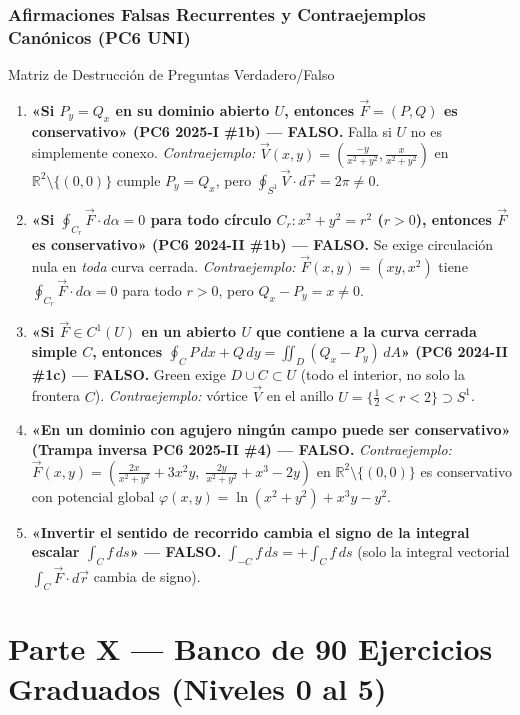 \documentclass[11pt,a4paper]{article}
\begin{document}
\section{Afirmaciones Falsas Recurrentes y Contraejemplos Canónicos (PC6 UNI)}
\begin{errorbox}{Matriz de Destrucción de Preguntas Verdadero/Falso}
\begin{enumerate}[leftmargin=*, itemsep=0.45em]
  \item \textbf{«Si $P_y = Q_x$ en su dominio abierto $U$, entonces $\vec{F}=(P,Q)$ es conservativo» (PC6 2025-I \#1b) --- FALSO.}
  Falla si $U$ no es simplemente conexo. \emph{Contraejemplo:} $\vec{V}(x,y) = \left(\frac{-y}{x^2+y^2}, \frac{x}{x^2+y^2}\right)$ en $\mathbb{R}^2\setminus\{(0,0)\}$ cumple $P_y = Q_x$, pero $\oint_{S^1}\vec{V}\cdot d\vec{r} = 2\pi \neq 0$.
  \item \textbf{«Si $\oint_{C_r} \vec{F}\cdot d\alpha = 0$ para todo círculo $C_r: x^2+y^2=r^2$ ($r>0$), entonces $\vec{F}$ es conservativo» (PC6 2024-II \#1b) --- FALSO.}
  Se exige circulación nula en \emph{toda} curva cerrada. \emph{Contraejemplo:} $\vec{F}(x,y)=(xy, x^2)$ tiene $\oint_{C_r}\vec{F}\cdot d\alpha = 0$ para todo $r>0$, pero $Q_x - P_y = x \neq 0$.
  \item \textbf{«Si $\vec{F} \in C^1(U)$ en un abierto $U$ que contiene a la curva cerrada simple $C$, entonces $\oint_C P\,dx+Q\,dy = \iint_D (Q_x-P_y)\,dA$» (PC6 2024-II \#1c) --- FALSO.}
  Green exige $D \cup C \subset U$ (todo el interior, no solo la frontera $C$). \emph{Contraejemplo:} vórtice $\vec{V}$ en el anillo $U = \{\frac{1}{2} < r < 2\} \supset S^1$.
  \item \textbf{«En un dominio con agujero ningún campo puede ser conservativo» (Trampa inversa PC6 2025-II \#4) --- FALSO.}
  \emph{Contraejemplo:} $\vec{F}(x,y) = \left(\frac{2x}{x^2+y^2}+3x^2y,\; \frac{2y}{x^2+y^2}+x^3-2y\right)$ en $\mathbb{R}^2\setminus\{(0,0)\}$ es conservativo con potencial global $\varphi(x,y) = \ln(x^2+y^2) + x^3y - y^2$.
  \item \textbf{«Invertir el sentido de recorrido cambia el signo de la integral escalar $\int_C f\,ds$» --- FALSO.}
  $\int_{-C} f\,ds = +\int_C f\,ds$ (solo la integral vectorial $\int_C \vec{F}\cdot d\vec{r}$ cambia de signo).
\end{enumerate}
\end{errorbox}


\newpage
\part*{Parte X --- Banco de 90 Ejercicios Graduados (Niveles 0 al 5)}
\end{document}
